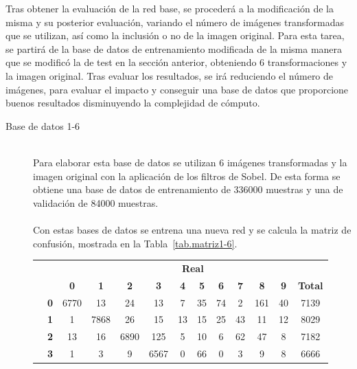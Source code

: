 Tras obtener la evaluación de la red base, se procederá a la modificación de la misma y su posterior evaluación, variando el número de imágenes transformadas que se utilizan, así como la inclusión o no de la imagen original. Para esta tarea, se partirá de la base de datos de entrenamiento modificada de la misma manera que se modificó la de test en la sección anterior, obteniendo 6 transformaciones y la imagen original. Tras evaluar los resultados, se irá reduciendo el número de imágenes, para evaluar el impacto y conseguir una base de datos que proporcione buenos resultados disminuyendo la complejidad de cómputo.\\

\begin{description}
	\item[Base de datos 1-6] \hfill 
	\vspace{10pt}
	\\
	Para elaborar esta base de datos se utilizan 6 imágenes transformadas y la imagen original con la aplicación de los filtros de Sobel. De esta forma se obtiene una base de datos de entrenamiento de 336000 muestras y una de validación de 84000 muestras.\\
	\vspace{-10pt}
	\\
	Con estas bases de datos se entrena una nueva red y se calcula la matriz de confusión, mostrada en la Tabla~\ref{tab.matriz1-6}.
	\begin{table}[H]
		\centering
		\begin{tabular}{|c|l|c|c|c|c|c|c|c|c|c|c|c|}
			\cline{3-13}  
			\multicolumn{2}{c|}{} & \multicolumn{11}{c|}{\textbf{Real}} \\ \cline{3-13} 
			\multicolumn{2}{c|}{} & \textbf{0} & \textbf{1} & \textbf{2} &  \textbf{3} & \textbf{4} & \textbf{5} & \textbf{6} & \textbf{7} & \textbf{8} & \textbf{9} & \textbf{Total}\\ \hline
			\multirow{10}{0.5cm}{\rotatebox{90}{\textbf{Predicción}}}& \textbf{0} & \cellcolor{lightgray}6770 & 13 & 24 & 13 & 7 & 35 & 74 & 2 & 161 & 40 & 7139\\ \cline{2-13}
			& \textbf{1} & 1 & \cellcolor{lightgray}7868 & 26 & 15 & 13 & 15 & 25 & 43 & 11 & 12 & 8029\\ \cline{2-13}
			& \textbf{2} & 13 & 16 & \cellcolor{lightgray}6890 & 125 & 5 & 10 & 6 & 62 & 47 & 8 & 7182\\ \cline{2-13}
			& \textbf{3} & 1 & 3 & 9 & \cellcolor{lightgray}6567 & 0 & 66 & 0 & 3 & 9 & 8 & 6666\\ \cline{2-13}

\end{tabular}
\end{table}
\end{description}
